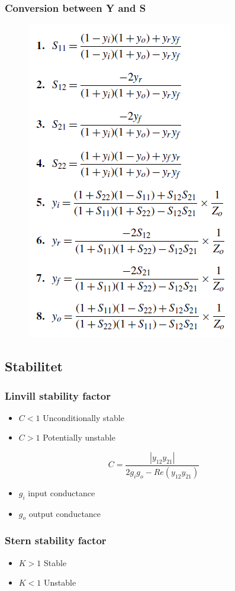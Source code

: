 \subsubsection{Conversion between Y and S}
\begin{figure} [H]
	\includegraphics[width=0.5\linewidth]{graphics/39.png}
\end{figure}

\subsection{Stabilitet}
\subsubsection{Linvill stability factor}
\begin{itemize}
	\item $C < 1$ Unconditionally stable
	\item $C > 1$ Potentially unstable
\end{itemize}

\begin{equation}
C = \dfrac{|y_{12}y_{21}|}{2g_ig_o-Re(y_{12}y_{21})}
\end{equation}

\begin{itemize}
	\item $g_i$ input conductance
	\item $g_o$ output conductance
\end{itemize}

\subsubsection{Stern stability factor}
\begin{itemize}
	\item $K > 1$ Stable
	\item $K < 1$ Unstable
\end{itemize}

